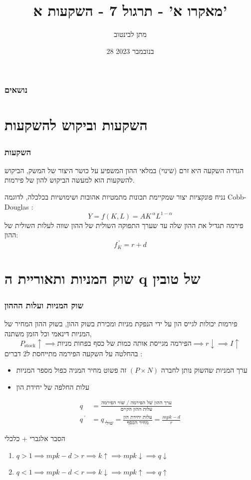 \documentclass[usenames,dvipsnames]{beamer}
\title[]{{מאקרו א' - תרגול 7 - השקעות א'}}
\author{\texthebrew{ מתן לבינטוב}}
\institute[{{ אב"ג}}]{{ אוניברסיטת בן גוריון בנגב}}
\date{28 בנובמבר 2023}
\begin{document}
\begin{RTL}
\begin{frame}
\titlepage
\end{frame}
\begin{frame}
    \frametitle{נושאים}
    \tableofcontents
    

\end{frame}
\section{השקעות וביקוש להשקעות}
\begin{frame}
    \frametitle{השקעות}
    \begin{exampleblock}{הגדרה}
        השקעה היא זרם (שינוי) במלאי ההון המשפיע על כושר היצור של המשק, הביקוש להשקעות הוא למעשה הביקוש להון של פירמות.
    \end{exampleblock}
    נניח פונקציות יצור שמקיימת תכונות מתמטיות אהובות ושימושיות בכלכלה, לדוגמה Cobb-Douglas :
    \[Y = f\left(K,L\right) = AK^{\ \alpha} L^{1-\alpha}\]
    פירמה תגדיל את ההון שלה עד שערך התפוקה השולית של ההון שווה לעלות השולית של ההון:
    \[f^{\ \prime}_K = r + d \]
    

\end{frame}
\section{שוק המניות ותאוריית ה q של טובין}
\begin{frame}[allowframebreaks]
    \frametitle{שוק המניות ועלות הההון}
    פירמות יכולות לגייס הון על ידי הנפקת מניות ומכירת בשוק ההון, בשוק ההון המחיר של המניות דינאמי וכל הזמן משתנה,
    \begin{equation*}
        P_{\text{stock}} \uparrow \implies \text{הפירמה מגייסת אותה כמות של כסף בפחות מניות} \implies r \downarrow \implies I \uparrow
    \end{equation*}
    בהחלטה על השקעה הפירמה מתייחסת ל2 דברים : 
    \begin{itemize}
        \item ערך המניות שהשוק נותן לחברה $\left(P \times N \right)$ זה פשוט מחיר המניה כפול מספר המניות
        \item עלות החלפה של יחידת הון
    \end{itemize}
    \begin{align*}
    q &= \frac{\text{ערך ההון של הפירמה / שווי הפירמה}}{\text{עלות ההון הקיים}}  \\  
    q^{\ \prime} &= q_{\ \text{שולי}} = \frac{\text{עלות יחידת הון}}{\text{מחיר הכסף}} 
     = \frac{mpk - d}{r}
    \end{align*}
    \framebreak
    \begin{block}{הסבר אלגברי + כלכלי}
        \begin{enumerate}
            \item $q > 1 \implies mpk - d > r \implies k \uparrow \implies mpk \downarrow \implies q \downarrow$
            \item $q < 1 \implies mpk - d < r \implies k \downarrow \implies mpk \uparrow \implies q \uparrow$
        \end{enumerate}


\end{block}
\end{frame}
\end{RTL}
\end{document}
